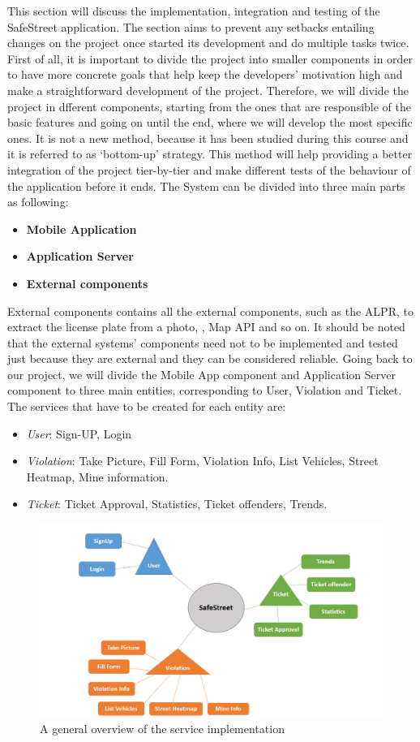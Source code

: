 This section will discuss the implementation, integration and testing of the SafeStreet application. The section aims to prevent any setbacks entailing changes on the project once started its development and do multiple tasks twice. First of all, it is important to divide the project into smaller components in order to have more concrete goals that help keep the developers’ motivation high and make a straightforward development of the project. Therefore, we will divide the project in dfferent components, starting from the ones that are responsible of the basic features and going on until the end, where we will develop the most speciﬁc ones. It is not a new method, because it has been studied during this course and it is referred to as ‘bottom-up’ strategy. This method will help providing a better integration of the project tier-by-tier and make different tests of the behaviour of the application before it ends. The System can be divided into three main parts as following:
\begin{itemize}
    \item \textbf{Mobile Application}
    \item \textbf{Application Server}
    \item \textbf{External components} 
\end{itemize}
 External components contains all the external components, such as the ALPR, to extract the license plate from a photo, , Map API and  so on. It should be noted that the external systems’ components need not to be implemented and tested just because they are external and they can be considered reliable.
Going back to our project, we will divide the Mobile App component and Application Server component to three main entities, corresponding to User, Violation and Ticket.
The services that have to be created for each entity are:
\begin{itemize}
\item{} \textit{User}: Sign-UP, Login
\item{} \textit{Violation}: Take Picture, Fill Form, Violation Info, List Vehicles, Street Heatmap, Mine information.
\item{} \textit{Ticket}: Ticket Approval, Statistics, Ticket offenders, Trends.
\end{itemize}

\begin{figure}
\centering
\includegraphics[width=\textwidth]{Images/ImplemetationandTest.png}
\caption{\label{fig:Test} A general overview of the service implementation}
\end{figure}

